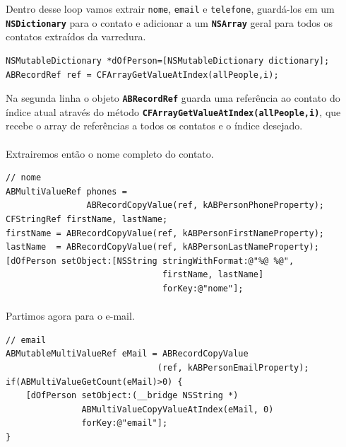 \documentclass[a4paper,12pt,brazil,doubleside]{book}
\begin{document}
Dentro desse loop vamos extrair \texttt{nome}, \texttt{email} e \texttt{telefone}, guardá-los em um \texttt{\textbf{NSDictionary}} para o contato e adicionar a um \texttt{\textbf{NSArray}} geral para todos os contatos extraídos da varredura.

\begin{listing}
\begin{verbatim}
NSMutableDictionary *dOfPerson=[NSMutableDictionary dictionary];
ABRecordRef ref = CFArrayGetValueAtIndex(allPeople,i);
\end{verbatim}
\end{listing}

Na segunda linha o objeto \texttt{\textbf{ABRecordRef}} guarda uma referência ao contato do índice atual através do método \texttt{\textbf{CFArrayGetValueAtIndex(allPeople,i)}}, que recebe o array de referências a todos os contatos e o índice desejado.
\paragraph{}Extrairemos então o nome completo do contato.

\begin{listing}
\begin{verbatim}
// nome
ABMultiValueRef phones =
                ABRecordCopyValue(ref, kABPersonPhoneProperty);
CFStringRef firstName, lastName;
firstName = ABRecordCopyValue(ref, kABPersonFirstNameProperty);
lastName  = ABRecordCopyValue(ref, kABPersonLastNameProperty);
[dOfPerson setObject:[NSString stringWithFormat:@"%@ %@",
                               firstName, lastName]
                               forKey:@"nome"];
\end{verbatim}
\end{listing}

\pagebreak

\paragraph{}Partimos agora para o e-mail.

\begin{listing}
\begin{verbatim}
// email
ABMutableMultiValueRef eMail = ABRecordCopyValue
                              (ref, kABPersonEmailProperty);
if(ABMultiValueGetCount(eMail)>0) {
    [dOfPerson setObject:(__bridge NSString *)
               ABMultiValueCopyValueAtIndex(eMail, 0)
               forKey:@"email"];
}
\end{verbatim}
\end{listing}
\end{document}
